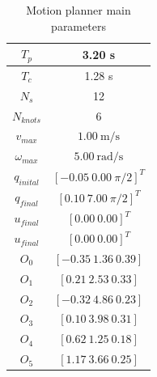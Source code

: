 \begin{table}[!h]
\caption {Motion planner main parameters} \label{tab:s3param}
\begin{center}
\begin{tabular}{|c|c|}
\hline
$T_p$ & 3.20 s\\
\hline 
$T_c$ & 1.28 s\\
\hline 
$N_s$ & 12\\
\hline 
$N_{knots}$ & 6\\
\hline
$v_{max}$ & $1.00\ \mathrm{m/s}$\\
\hline
$\omega_{max}$ & $5.00\ \mathrm{rad/s}$\\
\hline
$q_{inital}$ & $[-0.05\ 0.00\ \pi/2]^T$\\
\hline
$q_{final}$ & $[0.10\ 7.00\ \pi/2]^T$\\
\hline
$u_{final}$ & $[0.00\ 0.00]^T$\\
\hline
$u_{final}$ & $[0.00\ 0.00]^T$\\
\hline
$O_0$ & $[-0.35\ 1.36\ 0.39]$\\
\hline
$O_1$ & $[0.21\ 2.53\ 0.33]$\\
\hline
$O_2$ & $[-0.32\ 4.86\ 0.23]$\\
\hline
$O_3$ & $[0.10\ 3.98\ 0.31]$\\
\hline
$O_4$ & $[0.62\ 1.25\ 0.18]$\\
\hline
$O_5$ & $[1.17\ 3.66\ 0.25]$\\
\hline
\end{tabular}
\end{center}
\end{table}

